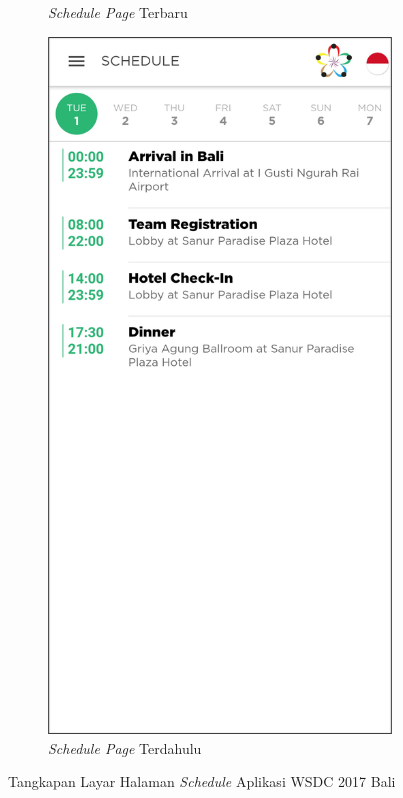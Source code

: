 \begin{figure}[H]
\begin{subfigure}[b]{0.3\textwidth}
         \caption{\textit{Schedule Page} Terbaru}
         \label{fig:ssSchedule}
     \end{subfigure}
     \hspace*{0.5in}
     \begin{subfigure}[b]{0.3\textwidth}
         \centering
         \includegraphics[width=\textwidth]{Gambar/SchedulePage.png}
         \caption{\textit{Schedule Page} Terdahulu}
         \label{fig:ssScheduleOld}
     \end{subfigure}
        \caption{Tangkapan Layar Halaman \textit{Schedule} Aplikasi WSDC 2017 Bali}
        \label{fig:ssApk1}
\end{figure}

